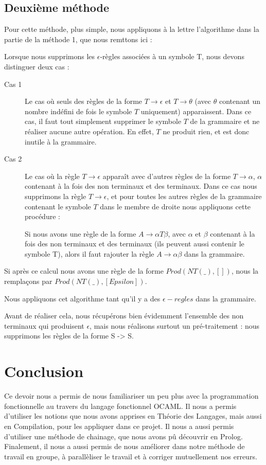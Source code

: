 \documentclass[11pt,a4paper]{article}
\begin{document}
\subsection{Deuxième méthode}

Pour cette méthode, plus simple, nous appliquons à la lettre l'algorithme dans la partie de la
méthode 1, que nous remttons ici :

Lorsque nous supprimons les $\epsilon$-règles associées à un
symbole T, nous devons distinguer deux cas :
\begin{description}
    \item[Cas 1] Le cas où seuls des règles de la forme
        $T \rightarrow \epsilon$ et $T \rightarrow \theta$
        (avec $\theta$ contenant un nombre indéfini de
        fois le symbole $T$ uniquement) apparaissent. Dans ce cas, il faut
        tout simplement supprimer le symbole $T$ de la grammaire et ne réaliser
        aucune autre opération. En effet, $T$ ne produit rien, et est
        donc inutile à la grammaire.
    \item[Cas 2] Le cas où la règle $T \rightarrow \epsilon$ apparaît avec d'autres
        règles de la forme $T \rightarrow \alpha$, $\alpha$ contenant
        à la fois des non terminaux et des terminaux. Dans ce cas nous supprimons
        la règle $T \rightarrow \epsilon$, et pour toutes les autres règles de la grammaire
        contenant le symbole $T$ dans le membre de droite nous appliquons cette
        procédure :

        Si nous avons une règle de la forme $A \rightarrow \alpha T \beta$,
        avec $\alpha$ et $\beta$ contenant à la fois des non terminaux et des terminaux
        (ils peuvent aussi contenir  le symbole T), alors il faut rajouter la règle
        $A \rightarrow \alpha \beta$ dans la grammaire.
\end{description}

Si après ce calcul nous avons une règle de la forme $Prod(NT(\_), [])$, nous la remplaçons
par $Prod(NT(\_), [Epsilon])$.

Nous appliquons cet algorithme tant qu'il y a des $\epsilon-regles$ dans la grammaire.

Avant de réaliser cela, nous récupérons bien évidemment l'ensemble des non terminaux
qui produisent $\epsilon$, mais nous réalisons surtout un pré-traitement : nous
supprimons les règles de la forme S -> S.

\newpage

\section{Conclusion}
Ce devoir nous a permis de nous familiariser un peu plus avec la
programmation fonctionnelle au travers du langage fonctionnel OCAML. Il nous a permis d'utiliser les notions que nous avons apprises en Théorie des Langages, mais aussi en Compilation, pour les appliquer
dans ce projet. Il nous a aussi permis d'utiliser une méthode de chainage, que nous avons pû découvrir en Prolog. Finalement, il nous a aussi permis de nous améliorer dans notre méthode de travail en groupe, à parallèliser le travail et à corriger mutuellement nos erreurs.
\end{document}
